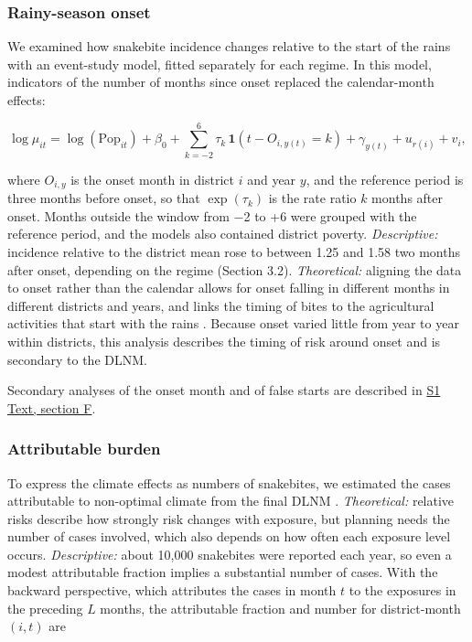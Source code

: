 \documentclass[11pt,a4paper]{article}
\begin{document}
\subsubsection{Rainy-season onset}

We examined how snakebite incidence changes relative to the start of the rains with an event-study model, fitted separately for each regime. In this model, indicators of the number of months since onset replaced the calendar-month effects:

\[\log \mu_{it} = \log(\text{Pop}_{it}) + \beta_0 + \sum_{k=-2}^{6} \tau_k\, \mathbf{1}(t - O_{i,y(t)} = k) + \gamma_{y(t)} + u_{r(i)} + v_i,\]

where \(O_{i,y}\) is the onset month in district \(i\) and year \(y\), and the reference period is three months before onset, so that \(\exp(\tau_k)\) is the rate ratio \(k\) months after onset. Months outside the window from −2 to +6 were grouped with the reference period, and the models also contained district poverty. \emph{Descriptive:} incidence relative to the district mean rose to between 1.25 and 1.58 two months after onset, depending on the regime (Section 3.2). \emph{Theoretical:} aligning the data to onset rather than the calendar allows for onset falling in different months in different districts and years, and links the timing of bites to the agricultural activities that start with the rains \cite{ref5,ref6}. Because onset varied little from year to year within districts, this analysis describes the timing of risk around onset and is secondary to the DLNM.

Secondary analyses of the onset month and of false starts are described in \hyperref[s1text-f]{S1 Text, section F}.

\subsubsection{Attributable burden}

To express the climate effects as numbers of snakebites, we estimated the cases attributable to non-optimal climate from the final DLNM \cite{ref46}. \emph{Theoretical:} relative risks describe how strongly risk changes with exposure, but planning needs the number of cases involved, which also depends on how often each exposure level occurs. \emph{Descriptive:} about 10,000 snakebites were reported each year, so even a modest attributable fraction implies a substantial number of cases. With the backward perspective, which attributes the cases in month \(t\) to the exposures in the preceding \(L\) months, the attributable fraction and number for district-month \((i,t)\) are
\end{document}
